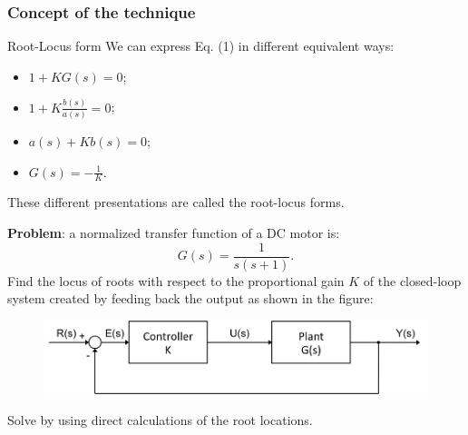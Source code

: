 \begin{frame}
\frametitle{Concept of the technique}
\justify
\begin{block}{Root-Locus form}
	We can express Eq. (1) in different equivalent ways:
	\vspace{1em}
	\begin{itemize}
	\item $1 + KG(s) = 0$;\\
	\item $1 + K\frac{b(s)}{a(s)} = 0$;\\
	\item $a(s) + Kb(s) =0$;\\
	\item $G(s) = -\frac{1}{K}$.
	\end{itemize}
	\vspace{1em}
	These different presentations are called the root-locus forms.
\end{block}
\end{frame}

\begin{frame}
	\begin{example}
		\textbf{Problem}: a normalized transfer function of a DC motor is:
		\begin{equation}
		G(s) = \frac{1}{s(s+1)}.
 		\end{equation}
 		Find the locus of roots with respect to the proportional gain $K$ of the closed-loop system created by feeding back the output as shown in the figure:
 		\begin{figure}
 			\centering
 			\includegraphics[width=0.8\linewidth]{closed_loop_diagram}
 		\end{figure}
 		Solve by using direct calculations of the root locations.
	\end{example}
\end{frame}

